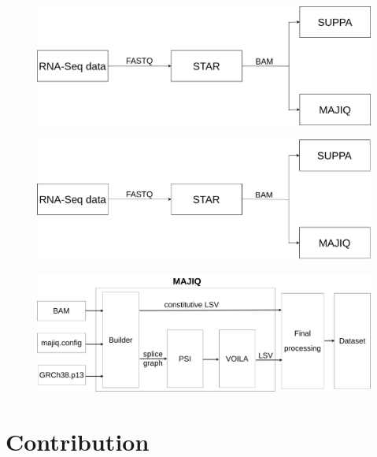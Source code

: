 \begin{figure}
	\includegraphics[width=1.\textwidth]{figures/d2v-Page-3.png}
\end{figure}

\begin{figure}
	\includegraphics[width=1.\textwidth]{figures/d2v-Page-3.pdf}
\end{figure}

\begin{figure}
	\includegraphics[width=1.\textwidth]{figures/d2v-majiq.pdf}
\end{figure}

\section{Contribution}



